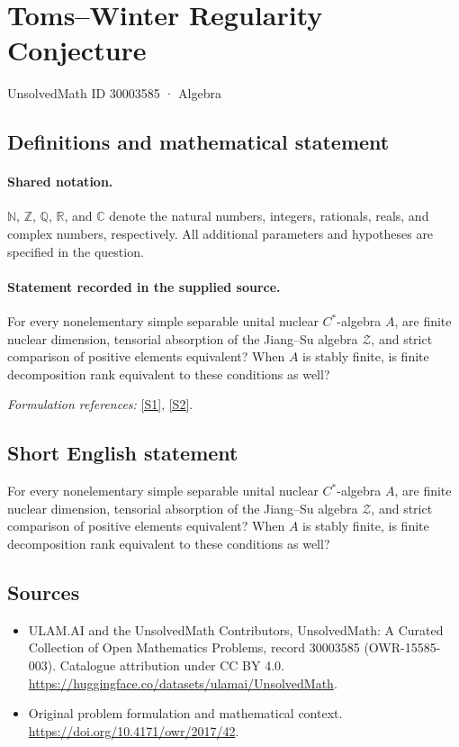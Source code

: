 \documentclass[11pt]{article}
\newcommand{\sref}[2]{\hyperlink{source:#1:#2}{[S#2]}}
\begin{document}
\setcounter{section}{30003584}
\section{Toms–Winter Regularity Conjecture}\label{30003585}
{\small UnsolvedMath ID 30003585 · Algebra}
\subsection{Definitions and mathematical statement}

\paragraph{Shared notation.}$\mathbb N$, $\mathbb Z$, $\mathbb Q$, $\mathbb R$, and $\mathbb C$ denote the natural numbers, integers, rationals, reals, and complex numbers, respectively. All additional parameters and hypotheses are specified in the question.


\paragraph{Statement recorded in the supplied source.}
For every nonelementary simple separable unital nuclear $C^*$-algebra $A$, are finite nuclear dimension, tensorial absorption of the Jiang–Su algebra $\mathcal Z$, and strict comparison of positive elements equivalent? When $A$ is stably finite, is finite decomposition rank equivalent to these conditions as well?
\par\smallskip\textit{Formulation references:} \sref{30003585}{1}, \sref{30003585}{2}.
\subsection{Short English statement}
For every nonelementary simple separable unital nuclear $C^*$-algebra $A$, are finite nuclear dimension, tensorial absorption of the Jiang–Su algebra $\mathcal Z$, and strict comparison of positive elements equivalent? When $A$ is stably finite, is finite decomposition rank equivalent to these conditions as well?
\subsection{Sources}
\begin{itemize}
\item[\hypertarget{source:30003585:1}{S1}] ULAM.AI and the UnsolvedMath Contributors, UnsolvedMath: A Curated Collection of Open Mathematics Problems, record 30003585 (OWR-15585-003). Catalogue attribution under CC BY 4.0.
\url{https://huggingface.co/datasets/ulamai/UnsolvedMath}.
\item[\hypertarget{source:30003585:2}{S2}] Original problem formulation and mathematical context.
\url{https://doi.org/10.4171/owr/2017/42}.
\end{itemize}
\label{end:30003585}
\end{document}
